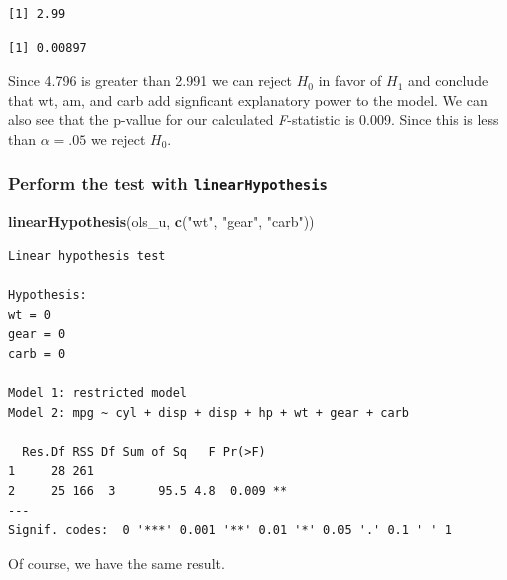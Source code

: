 \documentclass[]{book}
\newenvironment{Shaded}{\begin{snugshade}}{\end{snugshade}}
\newcommand{\CommentTok}[1]{\textcolor[rgb]{0.56,0.35,0.01}{\textit{#1}}}
\newcommand{\DataTypeTok}[1]{\textcolor[rgb]{0.13,0.29,0.53}{#1}}
\newcommand{\KeywordTok}[1]{\textcolor[rgb]{0.13,0.29,0.53}{\textbf{#1}}}
\newcommand{\NormalTok}[1]{#1}
\newcommand{\OperatorTok}[1]{\textcolor[rgb]{0.81,0.36,0.00}{\textbf{#1}}}
\newcommand{\StringTok}[1]{\textcolor[rgb]{0.31,0.60,0.02}{#1}}
\begin{document}
\begin{verbatim}
[1] 2.99
\end{verbatim}

\begin{Shaded}
\end{Shaded}

\begin{verbatim}
[1] 0.00897
\end{verbatim}

Since 4.796 is greater than 2.991 we can reject \(H_0\) in favor of \(H_1\) and conclude that wt, am, and carb add signficant explanatory power to the model. We can also see that the p-vallue for our calculated \emph{F}-statistic is 0.009. Since this is less than \(\alpha=.05\) we reject \(H_0\).

\hypertarget{perform-the-test-with-linearhypothesis}{%
\subsubsection{\texorpdfstring{Perform the test with \texttt{linearHypothesis}}{Perform the test with linearHypothesis}}\label{perform-the-test-with-linearhypothesis}}

\begin{Shaded}
\begin{Highlighting}[]
\KeywordTok{linearHypothesis}\NormalTok{(ols_u, }\KeywordTok{c}\NormalTok{(}\StringTok{"wt"}\NormalTok{, }\StringTok{"gear"}\NormalTok{, }\StringTok{"carb"}\NormalTok{))}
\end{Highlighting}
\end{Shaded}

\begin{verbatim}
Linear hypothesis test

Hypothesis:
wt = 0
gear = 0
carb = 0

Model 1: restricted model
Model 2: mpg ~ cyl + disp + disp + hp + wt + gear + carb

  Res.Df RSS Df Sum of Sq   F Pr(>F)   
1     28 261                           
2     25 166  3      95.5 4.8  0.009 **
---
Signif. codes:  0 '***' 0.001 '**' 0.01 '*' 0.05 '.' 0.1 ' ' 1
\end{verbatim}

Of course, we have the same result.
\end{document}

